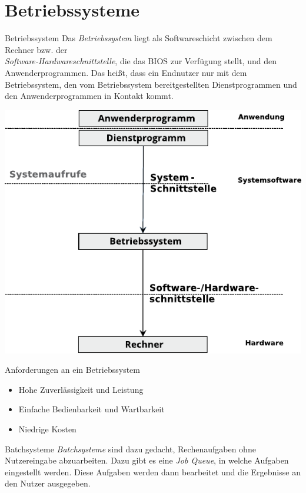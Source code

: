 \section{Betriebssysteme}

\begin{defi}{Betriebssystem}
    Das \emph{Betriebssystem} liegt als Softwareschicht zwischen dem Rechner bzw. der \\ \emph{Software-Hardwareschnittstelle}, die das BIOS zur Verfügung stellt, und den Anwenderprogrammen.
    Das heißt, dass ein Endnutzer nur mit dem Betriebssystem, den vom Betriebssystem bereitgestellten Dienstprogrammen und den Anwenderprogrammen in Kontakt kommt.

    \begin{center}
        \includegraphics[]{images/betriebssysteme.pdf}
    \end{center}
\end{defi}

\begin{bonus}{Anforderungen an ein Betriebssystem}
    \begin{itemize}
        \item Hohe Zuverlässigkeit und Leistung
        \item Einfache Bedienbarkeit und Wartbarkeit
        \item Niedrige Kosten
    \end{itemize}
\end{bonus}

\begin{bonus}{Batchsysteme}
    \emph{Batchsysteme} sind dazu gedacht, Rechenaufgaben ohne Nutzereingabe abzuarbeiten.
    Dazu gibt es eine \emph{Job Queue}, in welche Aufgaben eingestellt werden.
    Diese Aufgaben werden dann bearbeitet und die Ergebnisse an den Nutzer ausgegeben.
\end{bonus}

